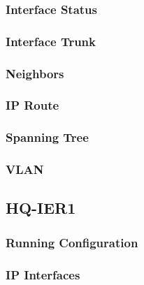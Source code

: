 \subsubsection{Interface Status}


\subsubsection{Interface Trunk}


\subsubsection{Neighbors}


\subsubsection{IP Route}


\subsubsection{Spanning Tree}


\subsubsection{VLAN}




\subsection{HQ-IER1}
\subsubsection{Running Configuration}


\subsubsection{IP Interfaces}


